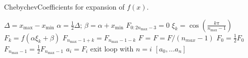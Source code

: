 \begin{algorithm}
  \caption{{\sc ChebychevCoefficients}
  for expansion of $f(x)$.
  \label{al:ChebyCoeffs}
  }
  \begin{algorithmic}[1]
    \Statex
    \Statex
     \State $\Delta = x_{\max} - x_{\min}$
     \State $\alpha = \frac{1}{2} \Delta$;
            $\beta = \alpha + x_{\min}$
     \State $F_{0:2 n_{\max}-3} = 0$
        \State $\xi_{k} = \cos\left( \frac{k \pi}{n_{\max} - 1} \right)$
        \State $F_k = f(\alpha \xi_{k} + \beta)$
     \EndFor
      
        \State $F_{n_{\max}-1+k} = F_{n_{\max}-1-k}$
     \EndFor
     \State $F$ = 
     \State $F = F / (n_{max}-1)$
     \State $F_0 = \frac{1}{2} F_0$
     \State $F_{n_{\max}-1} = \frac{1}{2} F_{n_{\max}-1}$
       \State $a_i = F_i$
        exit loop with $n=i$
     \EndFor
     \State \Return $[a_0, \dots a_n]$
   \EndProcedure
  \end{algorithmic}
\end{algorithm}

